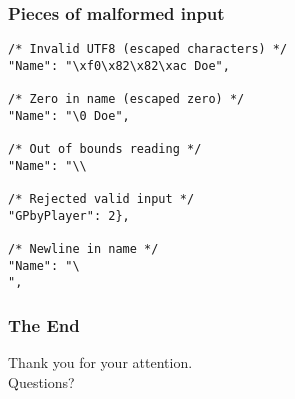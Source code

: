\documentclass{beamer}
\begin{document}

\begin{frame}[fragile]
\frametitle{Pieces of malformed input}

\begin{lstlisting}[stringstyle=\color{black}]
/* Invalid UTF8 (escaped characters) */
"Name": "\xf0\x82\x82\xac Doe",

/* Zero in name (escaped zero) */
"Name": "\0 Doe",

/* Out of bounds reading */
"Name": "\\

/* Rejected valid input */
"GPbyPlayer": 2},

/* Newline in name */
"Name": "\
",
\end{lstlisting}

\end{frame}


\begin{frame}
\frametitle{The End}

\begin{center}
\begin{Huge}
Thank you for your attention. \\
Questions?
\end{Huge}
\end{center}

\end{frame}
\end{document}
